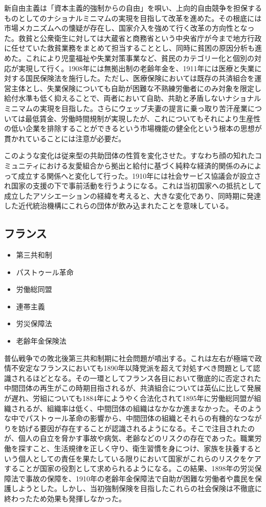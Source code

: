 \documentclass{jsarticle}
\begin{document}
新自由主義は「資本主義的強制からの自由」を唄い、上向的自由競争を担保するものとしてのナショナルミニマムの実現を目指して改革を進めた。その根底には市場メカニズムへの懐疑が存在し、国家介入を強めて行く改革の方向性となった。救貧と公衆衛生に対しては大蔵省と商務省という中央省庁が今まで地方行政に任せていた救貧業務をまとめて担当することとし、同時に貧困の原因分析も進めた。これにより児童福祉や失業対策事業など、貧民のカテゴリー化と個別の対応が実現して行く。1908年には無拠出制の老齢年金を、1911年には医療と失業に対する国民保険法を施行した。ただし、医療保険においては既存の共済組合を運営主体とし、失業保険についても自助が困難な不熟練労働者にのみ対象を限定し給付水準も低く抑えることで、両者において自助、共助と矛盾しないナショナルミニマムの実現を目指した。さらにウェッブ夫妻の提言に乗っ取り苦汗産業については最低賃金、労働時間規制が実現したが、これについてもそれにより生産性の低い企業を排除することができるという市場機能の健全化という根本の思想が貫かれていることには注意が必要だ。

このような変化は従来型の共助団体の性質を変化させた。すなわち顔の知れたコミュニティにおける友愛組合から拠出と給付に基づく純粋な経済的関係のみによって成立する関係へと変化して行った。1910年には社会サービス協議会が設立され国家の支援の下で事前活動を行うようになる。これは当初国家への抵抗として成立したアソシエーションの経緯を考えると、大きな変化であり、同時期に発達した近代統治機構にこれらの団体が飲み込まれたことを意味している。

\subsection{フランス}
\begin{itemize}
	\item 第三共和制
	\item パストゥール革命
	\item 労働総同盟
	\item 連帯主義
	\item 労災保障法
	\item 老齢年金保険法
\end{itemize}

普仏戦争での敗北後第三共和制期に社会問題が噴出する。これは左右が極端で政情不安定なフランスにおいても1890年以降党派を超えて対処すべき問題として認識されるほどとなる。その一環としてフランス各目において徹底的に否定された中間団体の再生がこの時期目指されるが、共済組合については英仏に比して発展が遅れ、労組についても1884年にようやく合法化されて1895年に労働総同盟が組織されるが、組織率は低く、中間団体の組織はなかなか進まなかった。そのような中でパストゥール革命の影響から、中間団体の組織とそれらの有機的なつながりを妨げる要因が存在することが認識されるようになる。そこで注目されたのが、個人の自立を脅かす事故や病気、老齢などのリスクの存在であった。職業労働を探すこと、生活規律を正しく守り、衛生習慣を身につけ、家族を扶養するという個人としての責任を果たしている限りにおいて国家がこれらのリスクをケアすることが国家の役割として求められるようになる。この結果、1898年の労災保障法で事故の保障を、1910年の老齢年金保障法で自助が困難な労働者や農民を保護しようとした。しかし、当初強制保険を目指したこれらの社会保険は不徹底に終わったため効果も発揮しなかった。
\end{document}
